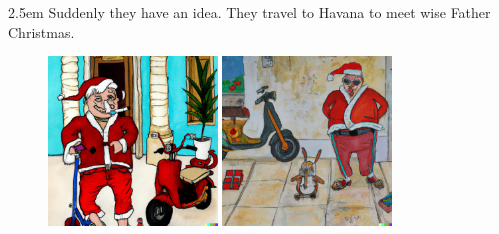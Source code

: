 \documentclass{article}
\newcommand{\imagewidthfactor}{0.4}
\newcommand{\addmarginA}{2.5em}
\newcommand{\addmarginB}{2.5em}
\begin{document}
\begin{addmargin}[\addmarginA]{\addmarginB}
Suddenly they have an idea. They travel to Havana to meet wise Father Christmas.
\end{addmargin}

\newpage %

\begin{figure}[h!]
\centering
\includegraphics[width=\imagewidthfactor\textwidth]{media/7a.png}
\quad
\includegraphics[width=\imagewidthfactor\textwidth]{media/7b.png}\\

\end{figure}
\end{document}
